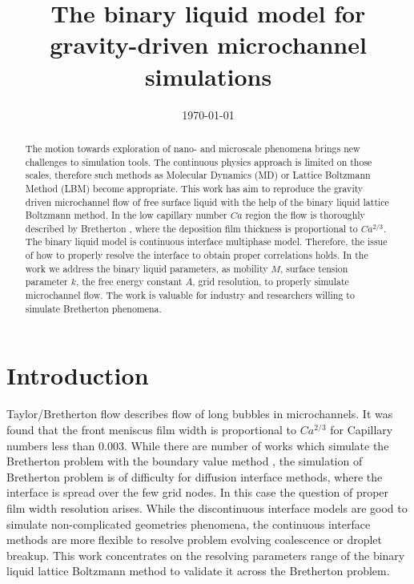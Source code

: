 \documentclass{article}
\title{The binary liquid model for gravity-driven microchannel simulations}
\date{\today}
\begin{document}
\maketitle

\begin{abstract}
The motion towards exploration of nano- and microscale phenomena brings new
challenges to simulation tools. The continuous physics approach is limited on
those scales, therefore such methods as Molecular Dynamics (MD) or Lattice
Boltzmann Method (LBM) become appropriate. This work has aim to
reproduce the gravity driven microchannel flow of free surface liquid with the
help of the binary liquid lattice Boltzmann method. In the low capillary number
$Ca$ region the flow is thoroughly described by Bretherton \cite{bretherton},
where the deposition film thickness is proportional to $Ca^{2/3}$. The binary
liquid model is continuous interface multiphase model. Therefore, the issue of
how to properly resolve the interface to obtain proper correlations holds. In
the work we address the binary liquid parameters, as mobility $M$, surface
tension parameter $k$, the free energy constant $A$, grid resolution, to
properly simulate microchannel flow. The work is valuable for industry and
researchers willing to simulate Bretherton phenomena.
\end{abstract}


\section{Introduction}
Taylor/Bretherton \cite{bretherton} flow describes flow of long bubbles in
microchannels. It was found that the front meniscus film width is proportional
to $Ca^{2/3}$ for Capillary numbers less than $0.003$. While there are number
of works which simulate the Bretherton problem with the boundary value method
\cite{ingham-plates,heil-planar}, the simulation of Bretherton problem is of
difficulty for diffusion interface methods, where the interface is spread over
the few grid nodes. In this case the question of proper film width resolution
arises. While the discontinuous interface models are good to simulate
non-complicated geometries phenomena, the continuous interface methods are more
flexible to resolve problem evolving coalescence or droplet breakup. This work
concentrates on the resolving parameters range of the binary liquid lattice
Boltzmann method to validate it across the Bretherton problem. 
\end{document}
